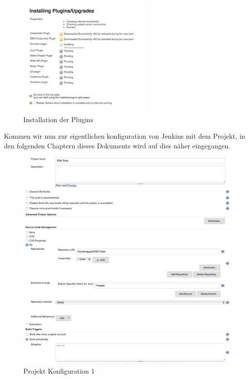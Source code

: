 \begin{figure}[h!]
	\caption{Installation der Plugins}
	\centering
	\includegraphics[width=0.6\textwidth, height=0.4\textheight]{images/jenkins_config2.png}
\end{figure}

Kommen wir nun zur eigentlichen konfiguration von Jenkins mit dem Projekt, in den folgenden Chaptern dieses Dokuments wird auf dies näher eingegangen.

\begin{figure}[h!]
	\caption{Projekt Konfiguration 1}
	\centering
	\includegraphics[width=\textwidth, height=0.8\textheight]{images/jenkins_projectConfig1.png}
\end{figure}

